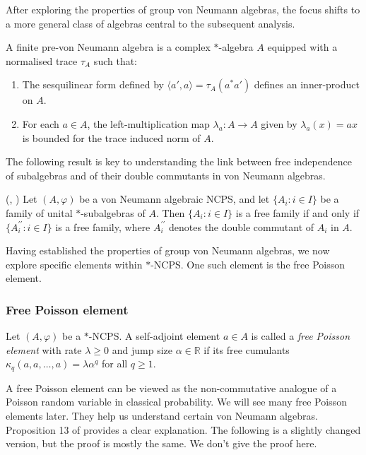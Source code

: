 After exploring the properties of group von Neumann algebras, the focus shifts to a more general class of algebras central to the subsequent analysis.

\begin{definition}
A finite pre-von Neumann algebra is a complex $*$-algebra $A$ equipped with a normalised trace $\tau_A$ such that:
\begin{enumerate}
    \item The sesquilinear form defined by $\langle a', a \rangle = \tau_A(a^* a')$ defines an inner-product on $A$.
    \item For each $a \in A$, the left-multiplication map $\lambda_a: A \to A$ given by $\lambda_a(x) = ax$ is bounded for the trace induced norm of $A$.
\end{enumerate}
\end{definition}

The following result is key to understanding the link between free independence of subalgebras and of their double commutants in von Neumann algebras.

\begin{lemma}(\cite[Lemma 2.5.7]{nicaspec}, \cite[Proposition 5, Chapter 6]{mingo2017})\label{primefreeness}
Let $(A, \varphi)$ be a von Neumann algebraic NCPS, and let $\{A_i : i \in I\}$ be a family of unital $*$-subalgebras of $A$. Then $\{A_i : i \in I\}$ is a free family if and only if $\{A_i^{\prime \prime} : i \in I\}$ is a free family, where $A_i^{\prime \prime}$ denotes the double commutant of $A_i$ in $A$.
\end{lemma}

Having established the properties of group von Neumann algebras, we now explore specific elements within $*$-NCPS. One such element is the free Poisson element.

\subsubsection{Free Poisson element}

\begin{definition}\label{freepoidefn}
Let $(A, \varphi)$ be a $*$-NCPS. A self-adjoint element $a \in A$ is called a \textit{free Poisson element} with rate $\lambda \geq 0$ and jump size $\alpha \in \mathbb{R}$ if its free cumulants $\kappa_q(a, a, \dots, a) = \lambda \alpha^q$ for all $q \geq 1$.
\end{definition}
A free Poisson element can be viewed as the non-commutative analogue of a Poisson random variable in classical probability. We will see many free Poisson elements later. They help us understand certain von Neumann algebras. Proposition 13 of \cite{JFApaper} provides a clear explanation.
The following is a slightly changed version, but the proof is mostly the same. We don't give the proof here.

